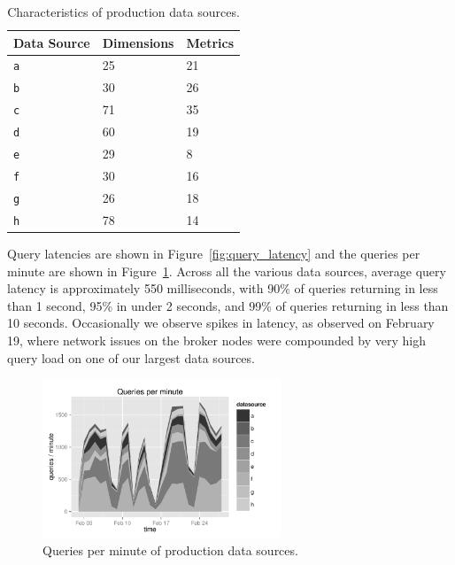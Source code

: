 \documentclass{vldb}
\begin{document}
\begin{table}
  \centering
  \scriptsize\begin{tabular}{| l | l | l |}
    \hline
    \textbf{Data Source} & \textbf{Dimensions} & \textbf{Metrics} \\ \hline
    \texttt{a} & 25 & 21 \\ \hline
    \texttt{b} & 30 & 26 \\ \hline
    \texttt{c} & 71 & 35 \\ \hline
    \texttt{d} & 60 & 19 \\ \hline
    \texttt{e} & 29 & 8 \\ \hline
    \texttt{f} & 30 & 16 \\ \hline
    \texttt{g} & 26 & 18 \\ \hline
    \texttt{h} & 78 & 14 \\ \hline
  \end{tabular}
  \normalsize
  \caption{Characteristics of production data sources.}
  \label{tab:datasources}
\end{table}

Query latencies are shown in Figure~\ref{fig:query_latency} and the queries per
minute are shown in Figure~\ref{fig:queries_per_min}. Across all the various
data sources, average query latency is approximately 550 milliseconds, with
90\% of queries returning in less than 1 second, 95\% in under 2 seconds, and
99\% of queries returning in less than 10 seconds. Occasionally we observe
spikes in latency, as observed on February 19, where network issues on
the broker nodes were compounded by very high query load on one of our
largest data sources.

\begin{figure}
\centering
\includegraphics[width = 2.8in]{queries_per_min}
\caption{Queries per minute of production data sources.}
\label{fig:queries_per_min}
\end{figure}
\end{document}
